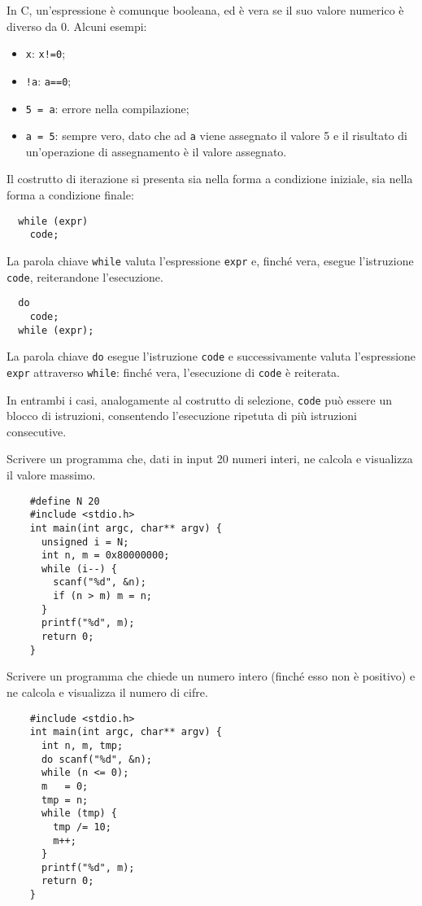 In C, un'espressione è comunque booleana, ed è vera se il suo valore numerico è diverso da 0.
Alcuni esempi:
\begin{itemize}
  \item \verb|x|: \verb|x!=0|;
  \item \verb|!a|: \verb|a==0|;
  \item \verb|5 = a|: errore nella compilazione;
  \item \verb|a = 5|: sempre vero, dato che ad \verb|a| viene assegnato il valore 5 e il risultato di un'operazione di assegnamento è il valore assegnato.
\end{itemize}

Il costrutto di iterazione si presenta sia nella forma a condizione iniziale, sia nella forma a condizione finale:
\begin{verbatim}
  while (expr)
    code;
\end{verbatim}
La parola chiave \verb|while| valuta l'espressione \verb|expr| e, finché vera, esegue l'istruzione \verb|code|, reiterandone l'esecuzione.
\begin{verbatim}
  do
    code;
  while (expr);
\end{verbatim}
La parola chiave \verb|do| esegue l'istruzione \verb|code| e successivamente valuta l'espressione \verb|expr| attraverso \verb|while|: finché vera, l'esecuzione di \verb|code| è reiterata.

In entrambi i casi, analogamente al costrutto di selezione, \verb|code| può essere un blocco di istruzioni, consentendo l'esecuzione ripetuta di più istruzioni consecutive.

\begin{example}
  Scrivere un programma che, dati in input 20 numeri interi, ne calcola e visualizza il valore massimo.
  \begin{verbatim}
    #define N 20
    #include <stdio.h>
    int main(int argc, char** argv) {
      unsigned i = N;
      int n, m = 0x80000000;
      while (i--) {
        scanf("%d", &n);
        if (n > m) m = n;
      }
      printf("%d", m);
      return 0;
    }\end{verbatim}
\end{example}

\begin{example}
  Scrivere un programma che chiede un numero intero (finché esso non è positivo) e ne calcola e visualizza il numero di cifre.
  \begin{verbatim}
    #include <stdio.h>
    int main(int argc, char** argv) {
      int n, m, tmp;
      do scanf("%d", &n);
      while (n <= 0);
      m   = 0;
      tmp = n;
      while (tmp) {
        tmp /= 10;
        m++;
      }
      printf("%d", m);
      return 0;
    }\end{verbatim}
\end{example}
